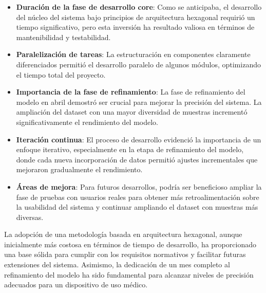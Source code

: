 \begin{itemize}
    \item \textbf{Duración de la fase de desarrollo core}: Como se anticipaba, el desarrollo del núcleo del sistema bajo principios de arquitectura hexagonal requirió un tiempo significativo, pero esta inversión ha resultado valiosa en términos de mantenibilidad y testabilidad.
    
    \item \textbf{Paralelización de tareas}: La estructuración en componentes claramente diferenciados permitió el desarrollo paralelo de algunos módulos, optimizando el tiempo total del proyecto.
    
    \item \textbf{Importancia de la fase de refinamiento}: La fase de refinamiento del modelo en abril demostró ser crucial para mejorar la precisión del sistema. La ampliación del dataset con una mayor diversidad de muestras incrementó significativamente el rendimiento del modelo.
    
    \item \textbf{Iteración continua}: El proceso de desarrollo evidenció la importancia de un enfoque iterativo, especialmente en la etapa de refinamiento del modelo, donde cada nueva incorporación de datos permitió ajustes incrementales que mejoraron gradualmente el rendimiento.
    
    \item \textbf{Áreas de mejora}: Para futuros desarrollos, podría ser beneficioso ampliar la fase de pruebas con usuarios reales para obtener más retroalimentación sobre la usabilidad del sistema y continuar ampliando el dataset con muestras más diversas.
\end{itemize}

La adopción de una metodología basada en arquitectura hexagonal, aunque inicialmente más costosa en términos de tiempo de desarrollo, ha proporcionado una base sólida para cumplir con los requisitos normativos y facilitar futuras extensiones del sistema. Asimismo, la dedicación de un mes completo al refinamiento del modelo ha sido fundamental para alcanzar niveles de precisión adecuados para un dispositivo de uso médico.